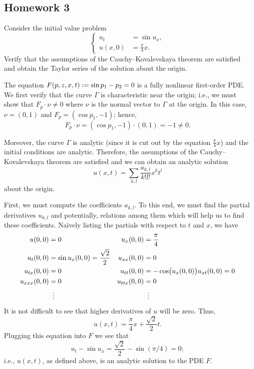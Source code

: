 \subsection{Homework 3}
\begin{problem}
  Consider the initial value problem
  \[
    \left\{
      \begin{aligned}
        u_t&=\sin u_x,\\
        u(x,0)&=\frac{\pi}{4}x.
      \end{aligned}
    \right.
  \]
  Verify that the assumptions of the Cauchy--Kovalevskaya theorem are
  satisfied and obtain the Taylor series of the solution about the origin.
\end{problem}
\begin{solution*}
  The equation \(F(p,z,x,t)\defeq\sin p_1-p_2=0\) is a fully nonlinear
  first-order PDE. We first verify that the curve \(\Gamma\) is
  characteristic near the origin; i.e., we must show that \(F_p\cdot\nu\neq
  0\) where \(\nu\) is the normal vector to \(\Gamma\) at the origin. In
  this case, \(\nu=(0,1)\) and \(F_p=(\cos p_1,-1)\); hence,
  \[
    F_p\cdot\nu= (\cos p_1,-1)\cdot(0,1)=-1\neq 0.
  \]

  Moreover, the curve \(\Gamma\) is analytic (since it is cut out by the
  equation \(\frac{\pi}{4}x\)) and the initial conditions are
  analytic. Therefore, the assumptions of the Cauchy--Kovalevskaya theorem
  are satisfied and we can obtain an analytic solution
  \[
    u(x,t)=\sum_{k,l}\frac{a_{k,l}}{k!l!}x^kt^l
  \]
  about the origin.

  First, we must compute the coefficients \(a_{k,l}\). To this end, we must
  find the partial derivatives \(u_{k,l}\) and potentially, relations among
  them which will help us to find these coefficients. Naïvely listing the
  partials with respect to \(t\) and \(x\), we have
  \begin{align*}
    u(0,0)&=0&
    u_x(0,0)&=\frac{\pi}{4}\\
    u_t(0,0)&=\sin u_x(0,0)=\frac{\sqrt{2}}{2}&
    u_{xx}(0,0)&=0\\
    u_{tx}(0,0)&=0&
    u_{tt}(0,0)&=-\cos\bigl(u_x(0,0)\bigr)u_{xt}(0,0)=0\\
    u_{xxx}(0,0)&=0&
    u_{ttx}(0,0)&=0\\
    &\vdotswithin{=}&&\vdotswithin{=}
  \end{align*}
  It is not difficult to see that higher derivatives of \(u\) will be
  zero. Thus,
  \[
    u(x,t)=\frac{\pi}{4}x+\frac{\sqrt{2}}{2}t.
  \]
  Plugging this equation into \(F\) we see that
  \[
    u_t-\sin u_x=\frac{\sqrt{2}}{2}-\sin(\pi/4)=0;
  \]
  i.e., \(u(x,t)\), as defined above, is an analytic solution to the PDE
  \(F\).
\end{solution*}

